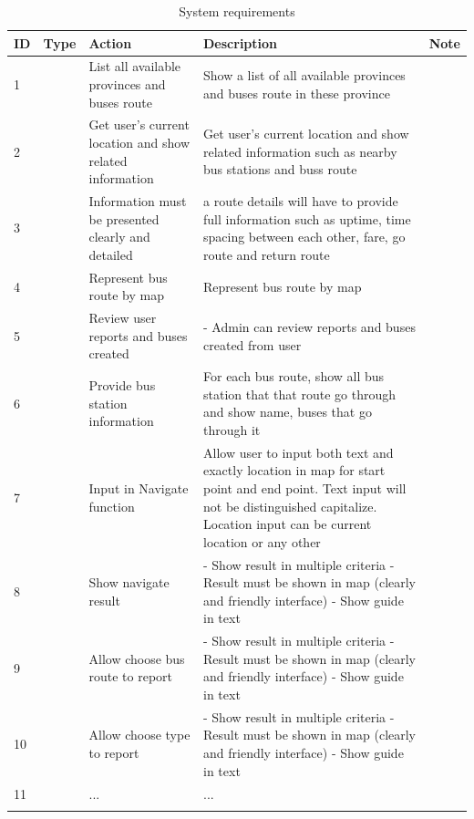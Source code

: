 	\begin{center}
		\begin{longtable}{|p{1cm}|p{1.5cm}|p{2.5cm}|>{\raggedright\arraybackslash}p{5cm}|p{2cm}|} 
			\hline
			\bfseries ID & \bfseries Type & \bfseries Action & \bfseries Description & \bfseries Note \\ 
			\hline\hline
			1 &  & List all available provinces and buses route & Show a list of all available provinces and buses route in these province & \\ 
			\hline
			2 &  & Get user's current location and show related information & Get user's current location and show related information such as nearby bus stations and buss route & \\ 
			\hline
			3 &  & Information must be presented clearly and detailed & a route details will have to provide full information such as uptime, time spacing between each other, fare, go route and return route & \\ 
			\hline
			4 &  & Represent bus route by map & Represent bus route by map  & \\ 
			\hline
			5 &  & Review user reports and buses created & - Admin can review reports and buses created from user & \\ 
			\hline
			6 &  & Provide bus station information & For each bus route, show all bus station that that route go through and show name, buses that go through it & \\ 
			\hline
			7 &  & Input in Navigate function & Allow user to input both text and exactly location in map for start point and end point. Text input will not be distinguished capitalize. Location input can be current location or any other  & \\ 
			
			\hline
			8 &  & Show navigate result & - Show result in multiple criteria \newline - Result must be shown in map (clearly and friendly interface) \newline - Show guide in text & \\ 
			\hline
			9 &  & Allow choose bus route to report & - Show result in multiple criteria \newline - Result must be shown in map (clearly and friendly interface) \newline - Show guide in text & \\ 
			\hline
			10 &  & Allow choose type to report & - Show result in multiple criteria \newline - Result must be shown in map (clearly and friendly interface) \newline - Show guide in text & \\ 
			\hline
			11 &  & ... & ... & \\ 
			\hline

			\caption{System requirements}
			\label{table:system_requirements} 
		\end{longtable}
	\end{center}

